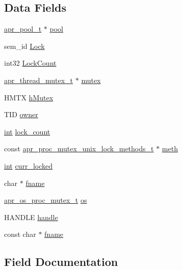 \subsection*{Data Fields}
\begin{DoxyCompactItemize}
\item 
\hyperlink{structapr__pool__t}{apr\+\_\+pool\+\_\+t} $\ast$ \hyperlink{structapr__proc__mutex__t_a2089fc7074e7a09ed1394083230f9707}{pool}
\item 
sem\+\_\+id \hyperlink{structapr__proc__mutex__t_af2dcbd4497e99a186ed779de6bc5193f}{Lock}
\item 
int32 \hyperlink{structapr__proc__mutex__t_ae1007187223409161fd5a522bafa011f}{Lock\+Count}
\item 
\hyperlink{structapr__thread__mutex__t}{apr\+\_\+thread\+\_\+mutex\+\_\+t} $\ast$ \hyperlink{structapr__proc__mutex__t_a4fb2becb93866ed96a60717a9face2c2}{mutex}
\item 
H\+M\+TX \hyperlink{structapr__proc__mutex__t_a78ec67f1708f9f520573ca1032735584}{h\+Mutex}
\item 
T\+ID \hyperlink{structapr__proc__mutex__t_adf31e53256e072cfb5e16e7807132fcf}{owner}
\item 
\hyperlink{pcre_8txt_a42dfa4ff673c82d8efe7144098fbc198}{int} \hyperlink{structapr__proc__mutex__t_a3bfbfcbb849cb18d6406181219ca6e89}{lock\+\_\+count}
\item 
const \hyperlink{structapr__proc__mutex__unix__lock__methods__t}{apr\+\_\+proc\+\_\+mutex\+\_\+unix\+\_\+lock\+\_\+methods\+\_\+t} $\ast$ \hyperlink{structapr__proc__mutex__t_a9ed4a16601501e9c5b4b3fd03c21f332}{meth}
\item 
\hyperlink{pcre_8txt_a42dfa4ff673c82d8efe7144098fbc198}{int} \hyperlink{structapr__proc__mutex__t_a26e8e0e38a96aa54d827aa4d0e8fba32}{curr\+\_\+locked}
\item 
char $\ast$ \hyperlink{structapr__proc__mutex__t_a7c4019c25a6cdc4a40fa7f70902fc754}{fname}
\item 
\hyperlink{structapr__os__proc__mutex__t}{apr\+\_\+os\+\_\+proc\+\_\+mutex\+\_\+t} \hyperlink{structapr__proc__mutex__t_a7d3bd1d639fd455825caaa338f972e87}{os}
\item 
H\+A\+N\+D\+LE \hyperlink{structapr__proc__mutex__t_ac5471e5085612911934fc86c8375a1b3}{handle}
\item 
const char $\ast$ \hyperlink{structapr__proc__mutex__t_ab42ae50b9d7ad38bf1c2b8ca9e6efb2f}{fname}
\end{DoxyCompactItemize}


\subsection{Field Documentation}
